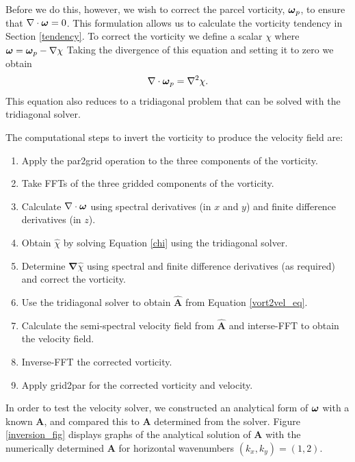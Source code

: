\documentclass{article}
\renewcommand{\v}[1]{\ensuremath{\mathbf{#1}}} %
\newcommand{\gv}[1]{\ensuremath{\mbox{\boldmath$ #1 $}}}
\newcommand{\grad}[1]{\v{\nabla} #1} %
\renewcommand{\div}[1]{\v{\nabla} \cdot #1} %
\begin{document}
Before we do this, however, we wish to correct the parcel vorticity, $\gv{\omega}_p$, to ensure that $\div{\gv{\omega}} = 0$. This formulation allows us to calculate the vorticity tendency in Section \ref{tendency}. To correct the vorticity we define a scalar $\chi$ where
$
  \gv{\omega} = \gv{\omega}_p - \grad{\chi}
$
Taking the divergence of this equation and setting it to zero we obtain
\begin{equation} \label{chi}
  \div{\gv{\omega}}_p = \nabla^2 \chi.
\end{equation}
This equation also reduces to a tridiagonal problem that can be solved with the tridiagonal solver.

The computational steps to invert the vorticity to produce the velocity field are:
\begin{enumerate}
  \item Apply the par2grid operation to the three components of the vorticity.
  \item Take FFTs of the three gridded components of the vorticity.
  \item Calculate $\div{\gv{\omega}}$ using spectral derivatives (in $x$ and $y$) and finite difference derivatives (in $z$).
  \item Obtain $\hat{\chi}$ by solving Equation \ref{chi} using the tridiagonal solver.
  \item Determine $\grad{\hat{\chi}}$ using spectral and finite difference derivatives (as required) and correct the vorticity.
  \item Use the tridiagonal solver to obtain $\hat{\v{A}}$ from Equation \ref{vort2vel_eq}.
  \item Calculate the semi-spectral velocity field from $\hat{\v{A}}$ and interse-FFT to obtain the velocity field.
  \item Inverse-FFT the corrected vorticity.
  \item Apply grid2par for the corrected vorticity and velocity.
\end{enumerate}

In order to test the velocity solver, we constructed an analytical form of $\gv{\omega}$ with a known $\v{A}$, and compared this to $\v{A}$ determined from the solver. Figure \ref{inversion_fig} displays graphs of the analytical solution of $\v{A}$ with the numerically determined $\v{A}$ for horizontal wavenumbers $(k_x,k_y)=(1,2)$.
\end{document}
